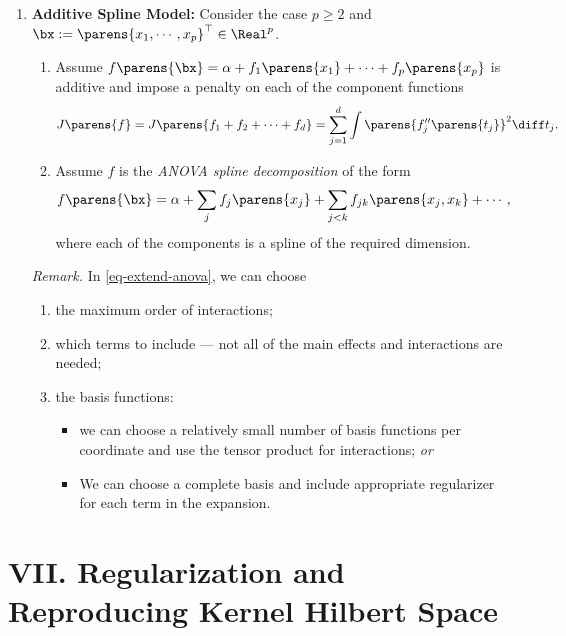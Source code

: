 \documentclass[12pt]{article}
\begin{document}
\begin{enumerate}[label=\textbf{\arabic*.}]
	\item \textbf{Additive Spline Model:} Consider the case $p \ge 2$ and $\bx := \parens{x_1, \cdots, x_p}^\top \in \Real^p$. 
	\begin{enumerate}
		\item Assume $f \parens{\bx} = \alpha + f_1 \parens{x_1} + \cdots + f_p \parens{x_p}$ is additive and impose a penalty on each of the component functions
		\begin{align*}
			J \parens{f} = J \parens{f_1 + f_2 + \cdots + f_d} = \sum_{j=1}^d \int \parens{f_j''\parens{t_j}}^2 \diff t_j. 
		\end{align*}
		
		\item Assume $f$ is the \emph{ANOVA spline decomposition} of the form 
		\begin{align}\label{eq-extend-anova}
			f \parens{\bx} = \alpha + \sum_{j} f_j \parens{x_j} + \sum_{j<k} f_{jk} \parens{x_j, x_k} + \cdots, 
		\end{align}
		where each of the components is a spline of the required dimension. 
	\end{enumerate}
	
	\textit{Remark.} In \eqref{eq-extend-anova}, we can choose 
	\begin{enumerate}
		\item the maximum order of interactions; 
		\item which terms to include --- not all of the main effects and interactions are needed; 
		\item the basis functions: 
		\begin{itemize}
			\item we can choose a relatively small number of basis functions per coordinate and use the tensor product for interactions; \emph{or} 
			\item We can choose a complete basis and include appropriate regularizer for each term in the expansion. 
		\end{itemize}
	\end{enumerate}
	
\end{enumerate}


\section*{VII. Regularization and Reproducing Kernel Hilbert Space} 
\end{document}
